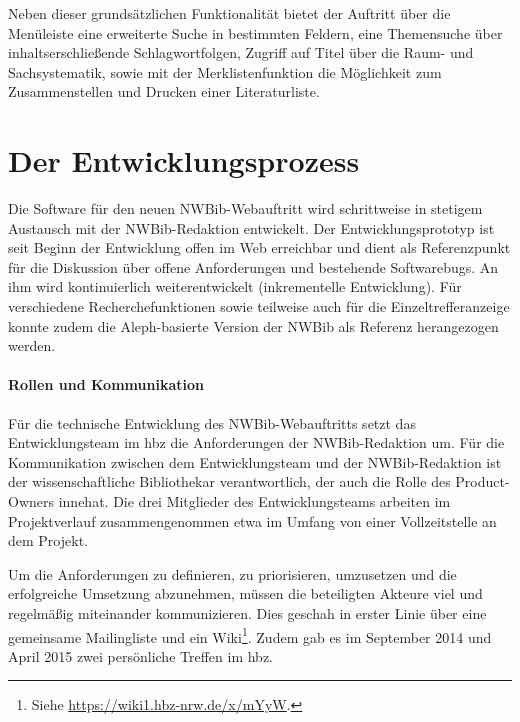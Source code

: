 \documentclass[a4paper,
fontsize=11pt,
oneside,
numbers=noperiodatend,
parskip=half-,
bibliography=totoc,
final
]{scrartcl}
\begin{document}
Neben dieser grundsätzlichen Funktionalität bietet der Auftritt über die
Menüleiste eine erweiterte Suche in bestimmten Feldern, eine Themensuche
über inhaltserschließende Schlagwortfolgen, Zugriff auf Titel über die
Raum- und Sachsystematik, sowie mit der Merklistenfunktion die
Möglichkeit zum Zusammenstellen und Drucken einer Literaturliste.

\section*{Der Entwicklungsprozess}\label{der-entwicklungsprozess}

Die Software für den neuen NWBib-Webauftritt wird schrittweise in
stetigem Austausch mit der NWBib-Redaktion entwickelt. Der
Entwicklungsprototyp ist seit Beginn der Entwicklung offen im Web
erreichbar und dient als Referenzpunkt für die Diskussion über offene
Anforderungen und bestehende Softwarebugs. An ihm wird kontinuierlich
weiterentwickelt (inkrementelle Entwicklung). Für verschiedene
Recherchefunktionen sowie teilweise auch für die Einzeltrefferanzeige
konnte zudem die Aleph-basierte Version der NWBib als Referenz
herangezogen werden.

\paragraph{Rollen und Kommunikation}\label{rollen-und-kommunikation}

Für die technische Entwicklung des NWBib-Webauftritts setzt das
Entwicklungsteam im hbz die Anforderungen der NWBib-Redaktion um. Für
die Kommunikation zwischen dem Entwicklungsteam und der NWBib-Redaktion
ist der wissenschaftliche Bibliothekar verantwortlich, der auch die
Rolle des Product-Owners innehat. Die drei Mitglieder des
Entwicklungsteams arbeiten im Projektverlauf zusammengenommen etwa im
Umfang von einer Vollzeitstelle an dem Projekt.

Um die Anforderungen zu definieren, zu priorisieren, umzusetzen und die
erfolgreiche Umsetzung abzunehmen, müssen die beteiligten Akteure viel
und regelmäßig miteinander kommunizieren. Dies geschah in erster Linie
über eine gemeinsame Mailingliste und ein Wiki\footnote{Siehe
  \url{https://wiki1.hbz-nrw.de/x/mYyW}.}. Zudem gab es im September
2014 und April 2015 zwei persönliche Treffen im hbz.
\end{document}

